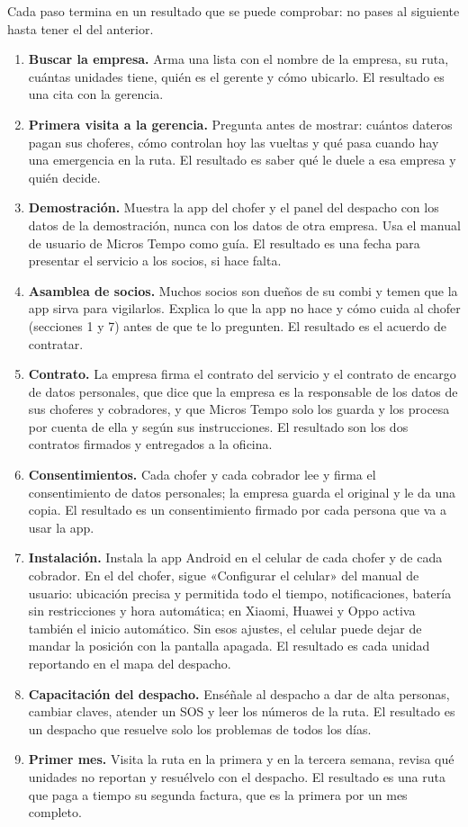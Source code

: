\documentclass[a4paper]{article}
\begin{document}
Cada paso termina en un resultado que se puede comprobar: no pases al siguiente hasta tener el del anterior.

\begin{enumerate}[label=\textbf{\arabic*.}, leftmargin=18pt, itemsep=5pt]
\item \textbf{Buscar la empresa.} Arma una lista con el nombre de la empresa, su ruta, cuántas unidades tiene, quién es el gerente y cómo ubicarlo. El resultado es una cita con la gerencia.
\item \textbf{Primera visita a la gerencia.} Pregunta antes de mostrar: cuántos dateros pagan sus choferes, cómo controlan hoy las vueltas y qué pasa cuando hay una emergencia en la ruta. El resultado es saber qué le duele a esa empresa y quién decide.
\item \textbf{Demostración.} Muestra la app del chofer y el panel del despacho con los datos de la demostración, nunca con los datos de otra empresa. Usa el manual de usuario de Micros Tempo como guía. El resultado es una fecha para presentar el servicio a los socios, si hace falta.
\item \textbf{Asamblea de socios.} Muchos socios son dueños de su combi y temen que la app sirva para vigilarlos. Explica lo que la app no hace y cómo cuida al chofer (secciones 1 y 7) antes de que te lo pregunten. El resultado es el acuerdo de contratar.
\item \textbf{Contrato.} La empresa firma el contrato del servicio y el contrato de encargo de datos personales, que dice que la empresa es la responsable de los datos de sus choferes y cobradores, y que Micros Tempo solo los guarda y los procesa por cuenta de ella y según sus instrucciones. El resultado son los dos contratos firmados y entregados a la oficina.
\item \textbf{Consentimientos.} Cada chofer y cada cobrador lee y firma el consentimiento de datos personales; la empresa guarda el original y le da una copia. El resultado es un consentimiento firmado por cada persona que va a usar la app.
\item \textbf{Instalación.} Instala la app Android en el celular de cada chofer y de cada cobrador. En el del chofer, sigue «Configurar el celular» del manual de usuario: ubicación precisa y permitida todo el tiempo, notificaciones, batería sin restricciones y hora automática; en Xiaomi, Huawei y Oppo activa también el inicio automático. Sin esos ajustes, el celular puede dejar de mandar la posición con la pantalla apagada. El resultado es cada unidad reportando en el mapa del despacho.
\item \textbf{Capacitación del despacho.} Enséñale al despacho a dar de alta personas, cambiar claves, atender un SOS y leer los números de la ruta. El resultado es un despacho que resuelve solo los problemas de todos los días.
\item \textbf{Primer mes.} Visita la ruta en la primera y en la tercera semana, revisa qué unidades no reportan y resuélvelo con el despacho. El resultado es una ruta que paga a tiempo su segunda factura, que es la primera por un mes completo.
\end{enumerate}
\end{document}
